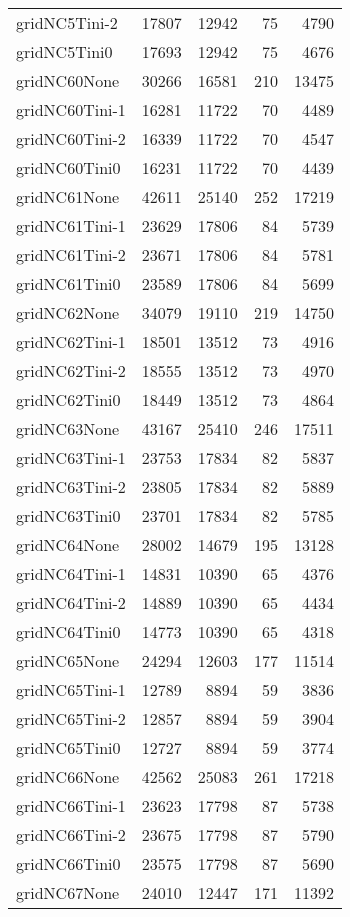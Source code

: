 \begin{longtable}{lrrrr}
gridNC5Tini-2 & 17807 & 12942 & 75 & 4790 \\
gridNC5Tini0 & 17693 & 12942 & 75 & 4676 \\
gridNC60None & 30266 & 16581 & 210 & 13475 \\
gridNC60Tini-1 & 16281 & 11722 & 70 & 4489 \\
gridNC60Tini-2 & 16339 & 11722 & 70 & 4547 \\
gridNC60Tini0 & 16231 & 11722 & 70 & 4439 \\
gridNC61None & 42611 & 25140 & 252 & 17219 \\
gridNC61Tini-1 & 23629 & 17806 & 84 & 5739 \\
gridNC61Tini-2 & 23671 & 17806 & 84 & 5781 \\
gridNC61Tini0 & 23589 & 17806 & 84 & 5699 \\
gridNC62None & 34079 & 19110 & 219 & 14750 \\
gridNC62Tini-1 & 18501 & 13512 & 73 & 4916 \\
gridNC62Tini-2 & 18555 & 13512 & 73 & 4970 \\
gridNC62Tini0 & 18449 & 13512 & 73 & 4864 \\
gridNC63None & 43167 & 25410 & 246 & 17511 \\
gridNC63Tini-1 & 23753 & 17834 & 82 & 5837 \\
gridNC63Tini-2 & 23805 & 17834 & 82 & 5889 \\
gridNC63Tini0 & 23701 & 17834 & 82 & 5785 \\
gridNC64None & 28002 & 14679 & 195 & 13128 \\
gridNC64Tini-1 & 14831 & 10390 & 65 & 4376 \\
gridNC64Tini-2 & 14889 & 10390 & 65 & 4434 \\
gridNC64Tini0 & 14773 & 10390 & 65 & 4318 \\
gridNC65None & 24294 & 12603 & 177 & 11514 \\
gridNC65Tini-1 & 12789 & 8894 & 59 & 3836 \\
gridNC65Tini-2 & 12857 & 8894 & 59 & 3904 \\
gridNC65Tini0 & 12727 & 8894 & 59 & 3774 \\
gridNC66None & 42562 & 25083 & 261 & 17218 \\
gridNC66Tini-1 & 23623 & 17798 & 87 & 5738 \\
gridNC66Tini-2 & 23675 & 17798 & 87 & 5790 \\
gridNC66Tini0 & 23575 & 17798 & 87 & 5690 \\
gridNC67None & 24010 & 12447 & 171 & 11392 \\

\end{longtable}
